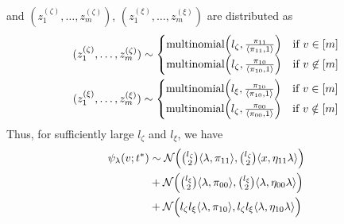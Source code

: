 \documentclass[draftcls]{IEEEtran}
\theoremstyle{definition}
\begin{document}
and $(z^{(\zeta)}_1, \dots, z^{(\zeta)}_m)$, $(z^{(\xi)}_1, \dots,
z^{(\xi)}_m)$ are distributed as
\begin{gather*}
(z^{(\zeta)}_1, \dots, z^{(\zeta)}_m) \sim
\begin{cases}
\textrm{multinomial}\Bigl(l_\zeta, \frac{\pi_{11}}{\langle \pi_{11},
  1\rangle}\Bigr) & \text{if $v \in [m]$} \\
\textrm{multinomial}\Bigl(l_\zeta, \frac{\pi_{10}}{\langle \pi_{10}, 1
  \rangle} \Bigr) & \text{if $v \not\in [m]$}
\end{cases} \\
(z^{(\xi)}_1, \dots, z^{(\xi)}_m) \sim
\begin{cases}
\textrm{multinomial}\Bigl(l_\xi, \frac{\pi_{10}}{\langle \pi_{10},
  1\rangle}\Bigr) & \text{if $v \in [m]$} \\
\textrm{multinomial}\Bigl(l_\zeta, \frac{\pi_{00}}{\langle \pi_{00}, 1
  \rangle} \Bigr) & \text{if $v \notin [m]$}
\end{cases} 
\end{gather*}
Thus, for sufficiently large $l_{\zeta}$ and $l_{\xi}$, we have
\begin{equation}
  \begin{split}
 \psi_{\lambda}(v;t^{*}) & \sim  \mathcal{N}\Bigl(\tbinom{l_\zeta}{2}
 \langle \lambda, \pi_{11} \rangle,
  \tbinom{l_\zeta}{2} \langle x, \eta_{11} \lambda \rangle \Bigr) \\ &+ 
  \mathcal{N}\Bigl(\tbinom{l_\xi}{2} \langle \lambda, \pi_{00} \rangle,
  \tbinom{l_\xi}{2} \langle \lambda, \eta_{00} \lambda \rangle \Bigr) \\ &+ 
  \mathcal{N}\Bigl(l_\zeta l_\xi \langle \lambda, \pi_{10} \rangle,
  l_\zeta l_\xi \langle \lambda, \eta_{10} \lambda \rangle \Bigr)
\end{split}
\end{equation}
\end{document}
